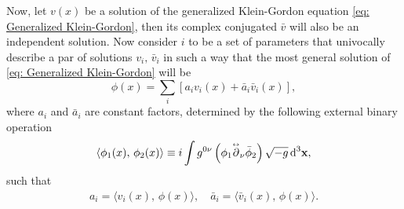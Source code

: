Now, let $v(x)$ be a solution of the generalized Klein-Gordon equation \ref{eq: Generalized Klein-Gordon}, then its complex conjugated $\bar{v}$ will also be an independent solution. Now consider $i$ to be a set of parameters that univocally describe a par of solutions $v_i,\,\bar v_i$ in such a way that the most general solution of \ref{eq: Generalized Klein-Gordon} will be
\begin{equation}
	\phi(x)=\sum_ i\left[a_iv_i(x)+\bar a_i\bar v_i(x)\right],
\end{equation}
where $a_i$ and $\bar a_i$ are constant factors, determined by the following external binary operation
\begin{equation}
	\langle \phi_1(x),\,\phi_2(x)\rangle\equiv i\int g^{0\nu}\left(\phi_1\overset{\text{\tiny$\leftrightarrow$}}{\partial}_\nu\bar \phi_2\right)\sqrt{-g}\,\text{d}^3\mathbf{x},
\end{equation}
such that
\begin{subequations}
	\begin{gather}
		a_i = \langle v_i(x),\,\phi(x)\rangle,\quad \bar a_i = \langle \bar v_i(x),\,\phi(x)\rangle.\tag{\theequation \,\,a,b}
	\end{gather}
\end{subequations}

